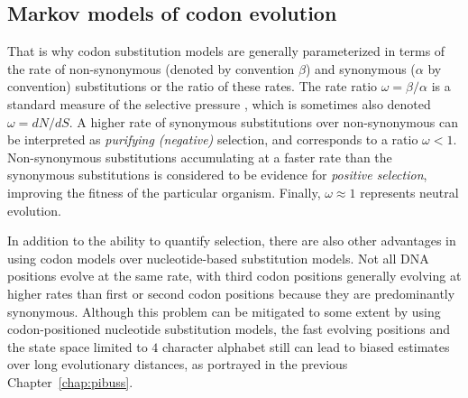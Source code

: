 \subsection{Markov models of codon evolution\label{sub:codon}}



That is why codon substitution models are generally parameterized in terms of the rate of non-synonymous (denoted by convention $\beta$) and synonymous ($\alpha$ by convention) substitutions or the ratio of these rates.
The rate ratio $\omega=\beta / \alpha$ is a standard measure of the selective pressure \citep{ThePhylogeneticHandbook}, which is sometimes also denoted $\omega = dN/dS$.
A higher rate of synonymous substitutions over non-synonymous can be interpreted as \emph{purifying (negative)} selection, and corresponds to a ratio $\omega <1$.
Non-synonymous substitutions accumulating at a faster rate than the synonymous substitutions is considered to be evidence for \emph{positive selection}, improving the fitness of the particular organism. Finally, $\omega\approx 1$ represents neutral evolution.

In addition to the ability to quantify selection, there are also other advantages in using codon models over nucleotide-based substitution models.
Not all DNA positions evolve at the same rate, with third codon positions generally evolving at higher rates than first or second codon positions because they are predominantly synonymous.
Although this problem can be mitigated to some extent by using codon-positioned nucleotide substitution models, the fast evolving positions and the state space limited to $4$ character alphabet still can lead to biased estimates over long evolutionary distances, as portrayed in the previous Chapter~\ref{chap:pibuss}.

